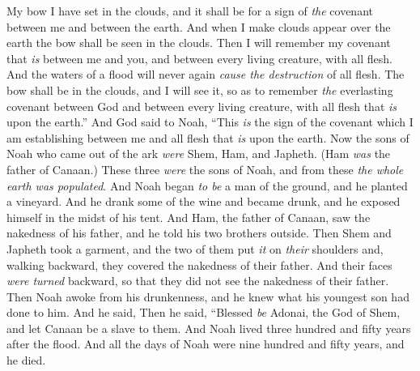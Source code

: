 \begin{biblechapter}
\verse My bow I have set in the clouds, and it shall be for a sign of \textit{the} covenant between me and between the earth.
\verse And when I make clouds appear over the earth the bow shall be seen in the clouds.
\verse Then I will remember my covenant that \textit{is} between me and you, and between every living creature, with all flesh. And the waters of a flood will never again \textit{cause the destruction} of all flesh.
\verse The bow shall be in the clouds, and I will see it, so as to remember \textit{the} everlasting covenant between God and between every living creature, with all flesh that \textit{is} upon the earth.”
\verse And God said to Noah, “This \textit{is} the sign of the covenant which I am establishing between me and all flesh that \textit{is} upon the earth.
 Now the sons of Noah who came out of the ark \textit{were} Shem, Ham, and Japheth. (Ham \textit{was} the father of Canaan.)
\verse These three \textit{were} the sons of Noah, and from these \textit{the whole earth was populated}.
\verse And Noah began \textit{to be} a man of the ground, and he planted a vineyard.
\verse And he drank some of the wine and became drunk, and he exposed himself in the midst of his tent.
\verse And Ham, the father of Canaan, saw the nakedness of his father, and he told his two brothers outside.
\verse Then Shem and Japheth took a garment, and the two of them put \textit{it} on \textit{their} shoulders and, walking backward, they covered the nakedness of their father. And their faces \textit{were turned} backward, so that they did not see the nakedness of their father.
\verse Then Noah awoke from his drunkenness, and he knew what his youngest son had done to him.
\verse And he said,
\verse Then he said,
\verse “Blessed \textit{be} Adonai, the God of Shem, 
and let Canaan be a slave to them.
\verse And Noah lived three hundred and fifty years after the flood.
\verse And all the days of Noah were nine hundred and fifty years, and he died.
\end{biblechapter}

